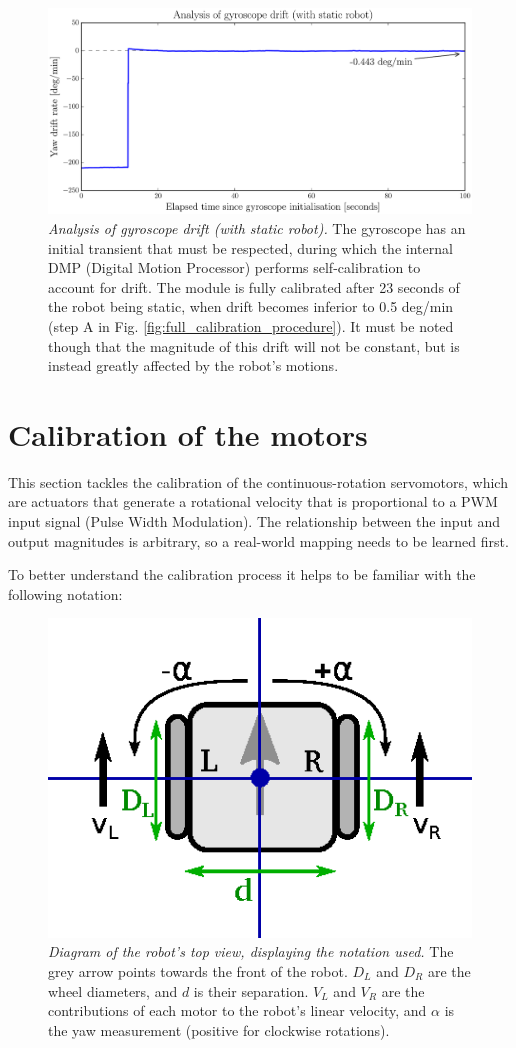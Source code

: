 \documentclass[12pt,twoside]{report}
\begin{document}
\begin{figure}[hbtp]
\centerline{
\includegraphics[width=0.9\linewidth]{gyro_drift}}
\caption[Analysis of gyroscope drift (with static robot)]{\emph{Analysis of gyroscope drift (with static robot).} The gyroscope has an initial transient that must be respected, during which the internal DMP (Digital Motion Processor) performs self-calibration to account for drift. The module is fully calibrated after 23 seconds of the robot being static, when drift becomes inferior to 0.5 deg/min (step A in Fig. \ref{fig:full_calibration_procedure}). It must be noted though that the magnitude of this drift will not be constant, but is instead greatly affected by the robot's motions.
}
\label{fig:gyro_drift}
\end{figure}








\section{Calibration of the motors} \label{sec:rotVel_section}

This section tackles the calibration of the continuous-rotation servomotors, which are actuators that generate a rotational velocity that is proportional to a PWM input signal (Pulse Width Modulation).
The relationship between the input and output magnitudes is arbitrary, so a real-world mapping needs to be learned first.

To better understand the calibration process it helps to be familiar with the following notation:

\begin{figure}[hbtp]
\centerline{
\includegraphics[width=0.33\linewidth]{robot_diagram_notation}}
\caption[Diagram of the robot's top view, displaying the notation used]{\emph{Diagram of the robot's top view, displaying the notation used.}
The grey arrow points towards the front of the robot.
$D_L$ and $D_R$ are the wheel diameters, and $d$ is their separation. $V_L$ and $V_R$ are the contributions of each motor to the robot's linear velocity, and $\alpha$ is the yaw measurement (positive for clockwise rotations).
}
\label{fig:robot_diagram_notation}
\end{figure}
\end{document}
